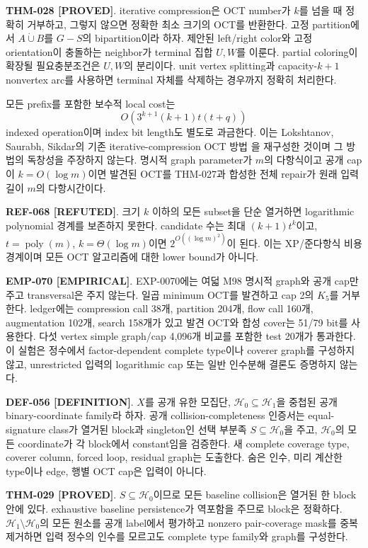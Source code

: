 \documentclass[11pt]{article}
\newcommand{\claimstatus}[2]{\textbf{#1 [#2]}}
\begin{document}
\claimstatus{THM-028}{PROVED}. iterative compression은 OCT number가
\(k\)를 넘을 때 정확히 거부하고, 그렇지 않으면 정확한 최소 크기의
OCT를 반환한다. 고정 partition에서 \(A\dot\cup B\)를 \(G-S\)의
bipartition이라 하자. 제안된 left/right color와 고정 orientation이
충돌하는 neighbor가 terminal 집합 \(U,W\)를 이룬다. partial coloring이
확장될 필요충분조건은 \(U,W\)의 분리이다. unit vertex splitting과
capacity-\(k+1\) nonvertex arc를 사용하면 terminal 자체를 삭제하는
경우까지 정확히 처리한다.

모든 prefix를 포함한 보수적 local cost는
\[
 O\!\left(3^{k+1}(k+1)t(t+q)\right)
\]
indexed operation이며 index bit length도 별도로 과금한다. 이는
Lokshtanov, Saurabh, Sikdar의 기존 iterative-compression OCT 방법
\cite{lokshtanov2009oct}을 재구성한 것이며 그 방법의 독창성을
주장하지 않는다. 명시적 graph parameter가 \(m\)의 다항식이고 공개
cap이 \(k=O(\log m)\)이면 발견된 OCT를 THM-027과 합성한 전체 repair가
원래 입력 길이 \(m\)의 다항시간이다.

\claimstatus{REF-068}{REFUTED}. 크기 \(k\) 이하의 모든 subset을
단순 열거하면 logarithmic polynomial 경계를 보존하지 못한다. candidate
수는 최대 \((k+1)t^k\)이고, \(t=\operatorname{poly}(m)\),
\(k=\Theta(\log m)\)이면 \(2^{O((\log m)^2)}\)이 된다. 이는
XP/준다항식 비용 경계이며 모든 OCT 알고리즘에 대한 lower bound가
아니다.

\claimstatus{EMP-070}{EMPIRICAL}. EXP-0070에는 여덟 M98 명시적 graph와
공개 cap만 주고 transversal은 주지 않는다. 일곱 minimum OCT를
발견하고 cap 2의 \(K_5\)를 거부한다. ledger에는 compression call
38개, partition 204개, flow call 160개, augmentation 102개, search
158개가 있고 발견 OCT와 합성 cover는 51/79 bit를 사용한다. 다섯
vertex simple graph/cap 4,096개 비교를 포함한 test 20개가 통과한다.
이 실험은 정수에서 factor-dependent complete type이나 coverer graph를
구성하지 않고, unrestricted 입력의 logarithmic cap 또는 일반
인수분해 결론도 증명하지 않는다.

\claimstatus{DEF-056}{DEFINITION}. \(X\)를 공개 유한 모집단,
\(\mathcal H_0\subseteq\mathcal H_1\)을 중첩된 공개 binary-coordinate
family라 하자. 공개 collision-completeness 인증서는 equal-signature
class가 열거된 block과 singleton인 선택 부분족
\(S\subseteq\mathcal H_0\)을 주고, \(\mathcal H_0\)의 모든 coordinate가
각 block에서 constant임을 검증한다. 새 complete coverage type,
coverer column, forced loop, residual graph는 도출한다. 숨은 인수,
미리 계산한 type이나 edge, 행별 OCT cap은 입력이 아니다.

\claimstatus{THM-029}{PROVED}. \(S\subseteq\mathcal H_0\)이므로 모든
baseline collision은 열거된 한 block 안에 있다. exhaustive baseline
persistence가 역포함을 주므로 block은 정확하다.
\(\mathcal H_1\setminus\mathcal H_0\)의 모든 원소를 공개 label에서
평가하고 nonzero pair-coverage mask를 중복 제거하면 입력 정수의 인수를
모르고도 complete type family와 graph를 구성한다.
\end{document}
